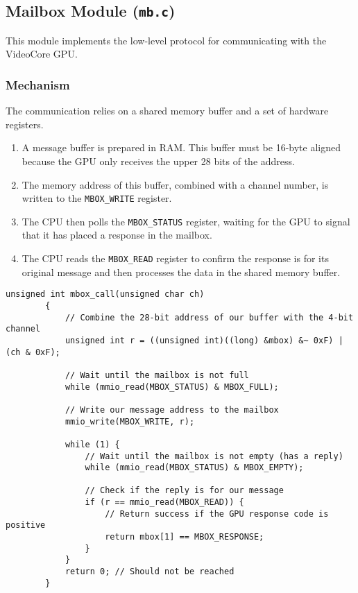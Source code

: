 \documentclass[a4paper, 11pt]{article}
\begin{document}
	\subsection{Mailbox Module (\texttt{mb.c})}
	This module implements the low-level protocol for communicating with the VideoCore GPU.
	
	\subsubsection{Mechanism}
	The communication relies on a shared memory buffer and a set of hardware registers.
	\begin{enumerate}
		\item A message buffer is prepared in RAM. This buffer must be 16-byte aligned because the GPU only receives the upper 28 bits of the address.
		\item The memory address of this buffer, combined with a channel number, is written to the \texttt{MBOX\_WRITE} register.
		\item The CPU then polls the \texttt{MBOX\_STATUS} register, waiting for the GPU to signal that it has placed a response in the mailbox.
		\item The CPU reads the \texttt{MBOX\_READ} register to confirm the response is for its original message and then processes the data in the shared memory buffer.
	\end{enumerate}
	
	\begin{lstlisting}[style=cstyle, caption={The core of the synchronous mailbox call.}]
		unsigned int mbox_call(unsigned char ch)
		{
			// Combine the 28-bit address of our buffer with the 4-bit channel
			unsigned int r = ((unsigned int)((long) &mbox) &~ 0xF) | (ch & 0xF);
			
			// Wait until the mailbox is not full
			while (mmio_read(MBOX_STATUS) & MBOX_FULL);
			
			// Write our message address to the mailbox
			mmio_write(MBOX_WRITE, r);
			
			while (1) {
				// Wait until the mailbox is not empty (has a reply)
				while (mmio_read(MBOX_STATUS) & MBOX_EMPTY);
				
				// Check if the reply is for our message
				if (r == mmio_read(MBOX_READ)) {
					// Return success if the GPU response code is positive
					return mbox[1] == MBOX_RESPONSE;
				}
			}
			return 0; // Should not be reached
		}
	\end{lstlisting}
	
\end{document}
